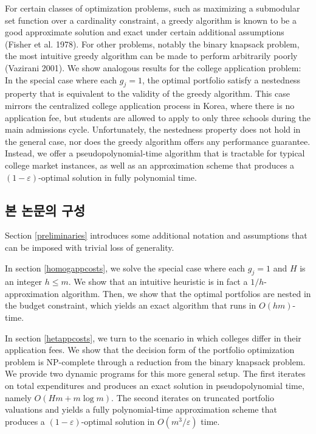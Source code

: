 \documentclass[12pt]{article} %
\newif\ifen
\theoremstyle{definition}
\theoremstyle{definition}
\begin{document}
For certain classes of optimization problems, such as maximizing a submodular set function over a cardinality constraint, a greedy algorithm is known to be a good approximate solution and exact under certain additional assumptions (Fisher et al. 1978). For other problems, notably the binary knapsack problem, the most intuitive greedy algorithm can be made to perform arbitrarily poorly (Vazirani 2001). We show analogous results for the college application problem: In the special case where each $g_j = 1$, the optimal portfolio satisfy a nestedness property that is equivalent to the validity of the greedy algorithm. This case mirrors the centralized college application process in Korea, where there is no application fee, but students are allowed to apply to only three schools during the main admissions cycle. Unfortunately, the nestedness property does not hold in the general case, nor does the greedy algorithm offers any performance guarantee. Instead, we offer a pseudopolynomial-time algorithm that is tractable for typical college market instances, as well as an approximation scheme that produces a $(1 - \varepsilon)$-optimal solution in fully polynomial time. 


\ifen \subsection{Structure of this paper} \else \subsection{본 논문의 구성}\fi
Section \ref{preliminaries} introduces some additional notation and assumptions that can be imposed with trivial loss of generality. 

In section \ref{homogappcosts}, we solve the special case where each $g_j = 1$ and $H$ is an integer $h \leq m$.  We show that an intuitive heuristic is in fact a $1/h$-approximation algorithm. Then, we show that the optimal portfolios are nested in the budget constraint, which yields an exact algorithm that runs in $O(hm)$-time.

In section \ref{hetappcosts}, we turn to the scenario in which colleges differ in their application fees. We show that the decision form of the portfolio optimization problem is NP-complete through a reduction from the binary knapsack problem. We provide two dynamic programs for this more general setup. The first iterates on total expenditures and produces an exact solution in pseudopolynomial time, namely $O(Hm + m \log m)$. The second iterates on truncated portfolio valuations and yields a fully polynomial-time approximation scheme that produces a $(1 - \varepsilon)$-optimal solution in $O(m^3 / \varepsilon)$ time.  
\end{document}
